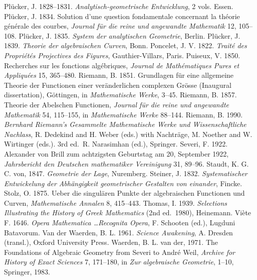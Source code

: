 \newline\indent Pl\"ucker, J. 1828--1831.  \emph{Analytisch-geometrische Entwicklung}, 2 vols. Essen. 
\newline\indent Pl\"ucker, J. 1834. Solution d'une question fondamentale concernant la th\'eorie g\'en\'erale des courbes, \emph{Journal f\"ur die reine und angewandte Mathematik} 12, 105--108.
\newline\indent Pl\"ucker, J. 1835. \emph{System der analytischen Geometrie}, Berlin.
\newline\indent Pl\"ucker, J. 1839. \emph{Theorie der algebraischen Curven}, Bonn.
\newline\indent Poncelet, J. V. 1822. \emph{Trait\'{e} des Propri\'{e}t\'{e}s Projectives des Figures}, Gauthier-Villars, Paris.
\newline\indent Puiseux, V. 1850. Recherches sur les fonctions alg\'ebriques, \emph{Journal de Math\'ematiques Pures et Appliqu\'ees} 15, 365--480.
\newline\indent Riemann, B. 1851.  Grundlagen f\"ur eine allgemeine Theorie der Functionen einer ver\-\"anderlichen complexen Gr\"osse (Inaugural dissertation), G\"ottingen, in \emph{Mathematische Werke}, 3--45.
 \newline\indent Riemann, B. 1857.  Theorie der Abelschen Functionen, \emph{Journal f\"ur die reine und angewandte Mathematik}  54, 115--155, in \emph{Mathematische Werke} 88--144.
 \newline\indent  Riemann, B. 1990. \emph{Bernhard Riemann's Gesammelte Mathematische Werke und Wissen\-schaft\-liche Nachlass}, R. Dedekind and  H. Weber (eds.)  with Nach\-tr\"age, M. Noether and W. Wirtinger (eds.). 3rd ed.\ R. Narasimhan (ed.), Springer.
 \newline\indent Severi, F. 1922.  Alexander von Brill zum achtzigsten Geburtstag am 20, September 1922, \emph{Jahrsbericht den Deutschen mathematiker Vereinigung} 31, 89--96.
  \newline\indent Staudt, K. G. C. von, 1847. \emph{Geometrie der Lage}, Nuremberg.
\newline\indent   Steiner, J. 1832. \emph{Systematischer Entwickelung der Abh\"angigkeit geometri\-scher Gestalten von einander}, Fincke.
 \newline\indent Stolz, O.  1875. Ueber die singul\"aren Punkte der algebraischen Functionen und Curven, \emph{Mathematische Annalen} 8, 415--443. 
\newline\indent Thomas, I. 1939. \emph{Selections Illustrating the History of Greek Mathematics} (2nd ed.\ 1980), Heinemann.
 \newline\indent Vi\`ete  F. 1646.  \emph{Opera Mathematica \ldots Recognita Opera}, F.  Schooten (ed.), Lugduni Batavorum.
\newline\indent Van der Waerden, B. L. 1961. \emph{Science Awakening}, A. Dresden (transl.), Oxford University Press.
\newline\indent Waerden, B. L. van der, 1971.  The Foundations of Algebraic Geometry from Severi to Andr{\'e} Weil, \emph{Archive for History of Exact Sciences} 7,  171--180, in  \emph{Zur algebraische Geometrie},  1--10, Springer, 1983.
 \normalsize
 
\endgroup
 

%
